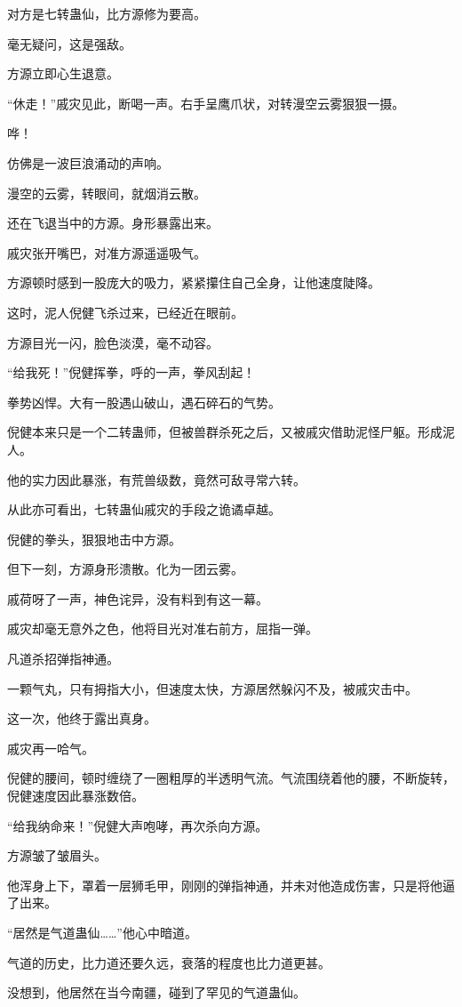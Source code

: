 \begin{this_body}
对方是七转蛊仙，比方源修为要高。

毫无疑问，这是强敌。

方源立即心生退意。

“休走！”戚灾见此，断喝一声。右手呈鹰爪状，对转漫空云雾狠狠一摄。

哗！

仿佛是一波巨浪涌动的声响。

漫空的云雾，转眼间，就烟消云散。

还在飞退当中的方源。身形暴露出来。

戚灾张开嘴巴，对准方源遥遥吸气。

方源顿时感到一股庞大的吸力，紧紧攥住自己全身，让他速度陡降。

这时，泥人倪健飞杀过来，已经近在眼前。

方源目光一闪，脸色淡漠，毫不动容。

“给我死！”倪健挥拳，呼的一声，拳风刮起！

拳势凶悍。大有一股遇山破山，遇石碎石的气势。

倪健本来只是一个二转蛊师，但被兽群杀死之后，又被戚灾借助泥怪尸躯。形成泥人。

他的实力因此暴涨，有荒兽级数，竟然可敌寻常六转。

从此亦可看出，七转蛊仙戚灾的手段之诡谲卓越。

倪健的拳头，狠狠地击中方源。

但下一刻，方源身形溃散。化为一团云雾。

戚荷呀了一声，神色诧异，没有料到有这一幕。

戚灾却毫无意外之色，他将目光对准右前方，屈指一弹。

凡道杀招弹指神通。

一颗气丸，只有拇指大小，但速度太快，方源居然躲闪不及，被戚灾击中。

这一次，他终于露出真身。

戚灾再一哈气。

倪健的腰间，顿时缠绕了一圈粗厚的半透明气流。气流围绕着他的腰，不断旋转，倪健速度因此暴涨数倍。

“给我纳命来！”倪健大声咆哮，再次杀向方源。

方源皱了皱眉头。

他浑身上下，罩着一层狮毛甲，刚刚的弹指神通，并未对他造成伤害，只是将他逼了出来。

“居然是气道蛊仙……”他心中暗道。

气道的历史，比力道还要久远，衰落的程度也比力道更甚。

没想到，他居然在当今南疆，碰到了罕见的气道蛊仙。


\end{this_body}

